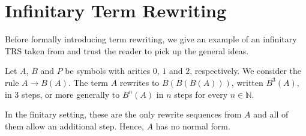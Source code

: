 \chapter{Infinitary Term Rewriting}\label{chap:rewriting}

Before formally introducing term rewriting, we give an example of an
infinitary TRS taken from \citet{klop-de-vrijer-05} and trust the
reader to pick up the general ideas.

Let $A$, $B$ and $P$ be symbols with arities $0$, $1$ and $2$,
respectively. We consider the rule $A \rightarrow B(A)$. The term $A$
rewrites to $B(B(B(A)))$, written $B^3(A)$, in $3$ steps, or more
generally to $B^n(A)$ in $n$ steps for every $n \in \mathbb{N}$.
\begin{center}
{\footnotesize{}}
\end{center}\vspace{-0.8\baselineskip}
In the finitary setting, these are the only rewrite sequences from $A$
and all of them allow an additional step. Hence, $A$ has no normal
form.

